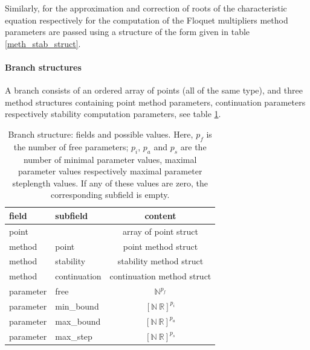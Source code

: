 \documentclass[10pt]{article}
\gdef \RR{{\mathbb R}}
\gdef \NN{{\mathbb N}}
\begin{document}
{Similarly, for the approximation and correction of roots of the 
characteristic equation respectively for the computation of the
Floquet multipliers
method parameters are passed using a structure of the form given
in table \ref{meth_stab_struct}.

\paragraph{Branch structures}

A branch consists of an ordered array of points (all of the same type), 
and three method structures
containing point method parameters, continuation parameters
respectively stability computation parameters,
see table \ref{branch_struct}.

\begin{table}
\begin{center}
\begin{tabular}{l|l|c}
field     & subfield     & content                    \\\hline 
point     &              & array of point struct      \\
method    & point        & point method struct        \\
method    & stability    & stability method struct    \\ 
method    & continuation & continuation method struct \\ 
parameter & free         & $\NN^{p_f}$                \\ 
parameter & min\_bound   & $[\NN\ \RR]^{p_i}$        \\
parameter & max\_bound   & $[\NN\ \RR]^{p_a}$        \\
parameter & max\_step    & $[\NN\ \RR]^{p_s}$        \\
\end{tabular}\end{center}
\caption{\small\label{branch_struct}Branch structure: fields and 
possible values. Here, $p_f$ is the number of free parameters; 
$p_i$, $p_a$ and $p_s$ are the number of minimal parameter values, 
maximal parameter values respectively 
maximal parameter steplength values. If any of these values are zero,
the corresponding subfield is empty.}
\end{table}

}
\end{document}
